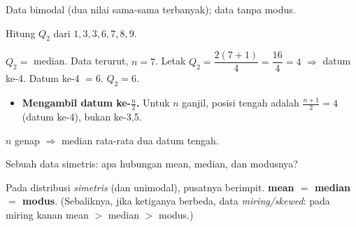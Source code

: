 \begin{variasi}
Data bimodal (dua nilai sama-sama terbanyak); data tanpa modus.
\end{variasi}

\begin{soalbox}{}
Hitung $Q_2$ dari $1,3,3,6,7,8,9$.
\end{soalbox}

\jawab
{} $Q_2=$ median. Data terurut, $n=7$. Letak $Q_2=\dfrac{2(7+1)}{4}
=\dfrac{16}{4}=4$ $\Rightarrow$ datum ke-4.
 Datum ke-4 $=6$.
\jadi $Q_2=6$.

\begin{jebakan}
\begin{itemize}[leftmargin=*,topsep=2pt]
  \item \textbf{Mengambil datum ke-$\frac n2$.} Untuk $n$ ganjil, posisi tengah
  adalah $\frac{n+1}{2}=4$ (datum ke-4), bukan ke-3,5.
\end{itemize}
\end{jebakan}

\begin{variasi}
$n$ genap $\Rightarrow$ median rata-rata dua datum tengah.
\end{variasi}

\begin{soalbox}{}
Sebuah data simetris: apa hubungan mean, median, dan modusnya?
\end{soalbox}

\jawab
{} Pada distribusi \emph{simetris} (dan unimodal), pusatnya berimpit.
\jadi \textbf{mean $=$ median $=$ modus}. (Sebaliknya, jika ketiganya berbeda,
data \emph{miring/skewed}: pada miring kanan mean $>$ median $>$ modus.)

\begin{center}
\end{center}

